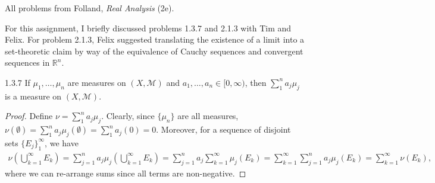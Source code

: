 \documentclass[11pt]{article}
\begin{document}
All problems from Folland, \textit{Real Analysis} (2e).

For this assignment, I briefly discussed problems 1.3.7 and 2.1.3 with Tim and Felix. For problem 2.1.3, Felix suggested translating the existence of a limit into a set-theoretic claim by way of the equivalence of Cauchy sequences and convergent sequences in \( \mathbb{R}^n \).
\begin{problem}{1.3.7}
	If \(\mu_1, \dots, \mu_n\) are measures on \( (X, \mathcal{M}) \) and \( a_1, \dots, a_n \in [0,\infty) \), then \( \sum\limits_1^n a_j\mu_j \) is a measure on \( (X, \mathcal{M}) \).
\end{problem}
\begin{proof}
	Define \( \nu = \sum\limits_1^n a_j \mu_j \).
	Clearly, since \( \{\mu_n\} \) are all measures, \(\nu(\emptyset) = \sum\limits_1^n a_j \mu_j(\emptyset) = \sum\limits_1^n a_j(0) = 0\).
	Moreover, for a sequence of disjoint sets \( \{ E_{j} \}_1^{\infty} \), we have
	\begin{equation}
		\label{eq:1}
		\begin{aligned}
			\nu(\bigcup_{k=1}^{\infty} E_k) = \sum\limits_{j=1}^n a_j \mu_j(\bigcup_{k=1}^{\infty} E_k) = \sum\limits_{j=1}^n a_j \sum\limits_{k=1}^{\infty} \mu_j(E_k) = \sum\limits_{k=1}^{\infty} \sum\limits_{j=1}^n a_j \mu_j(E_k) = \sum\limits_{k=1}^{\infty} \nu(E_k),
		\end{aligned}
	\end{equation}
	where we can re-arrange sums since all terms are non-negative.
\end{proof}
\end{document}
